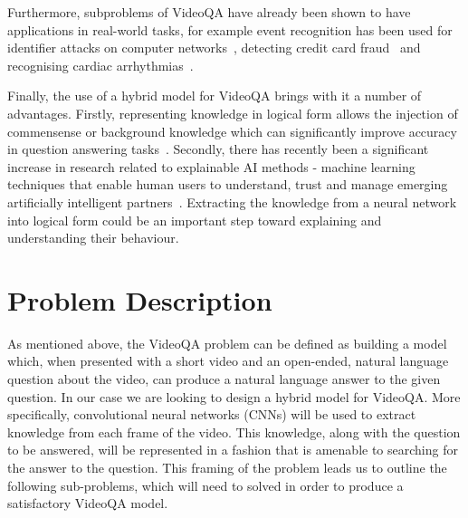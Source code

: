 \documentclass[../interim.tex]{subfiles}
\begin{document}
Furthermore, subproblems of VideoQA have already been shown to have applications in real-world tasks, for example event recognition has been used for identifier attacks on computer networks~\cite{ED-uses:networks}, detecting credit card fraud~\cite{ED-uses:fraud} and recognising cardiac arrhythmias~\cite{ED-uses:cardiac}.

Finally, the use of a hybrid model for VideoQA brings with it a number of advantages. Firstly, representing knowledge in logical form allows the injection of commensense or background knowledge which can significantly improve accuracy in question answering tasks~\cite{motivation:external-knowledge}. Secondly, there has recently been a significant increase in research related to explainable AI methods - machine learning techniques that enable human users to understand, trust and manage emerging artificially intelligent partners~\cite{def:xai}. Extracting the knowledge from a neural network into logical form could be an important step toward explaining and understanding their behaviour.


\section{Problem Description}

As mentioned above, the VideoQA problem can be defined as building a model which, when presented with a short video and an open-ended, natural language question about the video, can produce a natural language answer to the given question. In our case we are looking to design a hybrid model for VideoQA. More specifically, convolutional neural networks (CNNs) will be used to extract knowledge from each frame of the video. This knowledge, along with the question to be answered, will be represented in a fashion that is amenable to searching for the answer to the question. This framing of the problem leads us to outline the following sub-problems, which will need to solved in order to produce a satisfactory VideoQA model.
\end{document}
